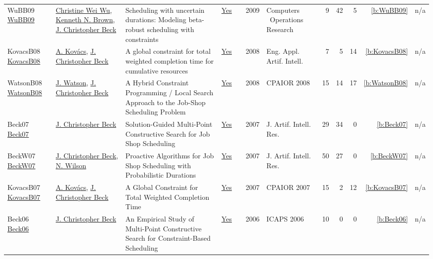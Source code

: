 {\begin{longtable}{>{\raggedright\arraybackslash}p{3cm}>{\raggedright\arraybackslash}p{6cm}>{\raggedright\arraybackslash}p{6.5cm}rrrp{2.5cm}rrrrr}
WuBB09 \href{https://doi.org/10.1016/j.cor.2008.08.008}{WuBB09} & \hyperref[auth:a276]{Christine Wei Wu}, \hyperref[auth:a222]{Kenneth N. Brown}, \hyperref[auth:a89]{J. Christopher Beck} & Scheduling with uncertain durations: Modeling beta-robust scheduling with constraints & \href{../works/WuBB09.pdf}{Yes} & \cite{WuBB09} & 2009 & Computers \  Operations Research & 9 & 42 & 5 & \ref{b:WuBB09} & n/a\\
KovacsB08 \href{https://doi.org/10.1016/j.engappai.2008.03.004}{KovacsB08} & \hyperref[auth:a147]{A. Kov{\'{a}}cs}, \hyperref[auth:a89]{J. Christopher Beck} & A global constraint for total weighted completion time for cumulative resources & \href{../works/KovacsB08.pdf}{Yes} & \cite{KovacsB08} & 2008 & Eng. Appl. Artif. Intell. & 7 & 5 & 14 & \ref{b:KovacsB08} & n/a\\
WatsonB08 \href{https://doi.org/10.1007/978-3-540-68155-7_21}{WatsonB08} & \hyperref[auth:a363]{J. Watson}, \hyperref[auth:a89]{J. Christopher Beck} & A Hybrid Constraint Programming / Local Search Approach to the Job-Shop Scheduling Problem & \href{../works/WatsonB08.pdf}{Yes} & \cite{WatsonB08} & 2008 & CPAIOR 2008 & 15 & 14 & 17 & \ref{b:WatsonB08} & n/a\\
Beck07 \href{https://doi.org/10.1613/jair.2169}{Beck07} & \hyperref[auth:a89]{J. Christopher Beck} & Solution-Guided Multi-Point Constructive Search for Job Shop Scheduling & \href{../works/Beck07.pdf}{Yes} & \cite{Beck07} & 2007 & J. Artif. Intell. Res. & 29 & 34 & 0 & \ref{b:Beck07} & n/a\\
BeckW07 \href{https://doi.org/10.1613/jair.2080}{BeckW07} & \hyperref[auth:a89]{J. Christopher Beck}, \hyperref[auth:a832]{N. Wilson} & Proactive Algorithms for Job Shop Scheduling with Probabilistic Durations & \href{../works/BeckW07.pdf}{Yes} & \cite{BeckW07} & 2007 & J. Artif. Intell. Res. & 50 & 27 & 0 & \ref{b:BeckW07} & n/a\\
KovacsB07 \href{https://doi.org/10.1007/978-3-540-72397-4_9}{KovacsB07} & \hyperref[auth:a147]{A. Kov{\'{a}}cs}, \hyperref[auth:a89]{J. Christopher Beck} & A Global Constraint for Total Weighted Completion Time & \href{../works/KovacsB07.pdf}{Yes} & \cite{KovacsB07} & 2007 & CPAIOR 2007 & 15 & 2 & 12 & \ref{b:KovacsB07} & n/a\\
Beck06 \href{http://www.aaai.org/Library/ICAPS/2006/icaps06-028.php}{Beck06} & \hyperref[auth:a89]{J. Christopher Beck} & An Empirical Study of Multi-Point Constructive Search for Constraint-Based Scheduling & \href{../works/Beck06.pdf}{Yes} & \cite{Beck06} & 2006 & ICAPS 2006 & 10 & 0 & 0 & \ref{b:Beck06} & n/a\\

\end{longtable}}
